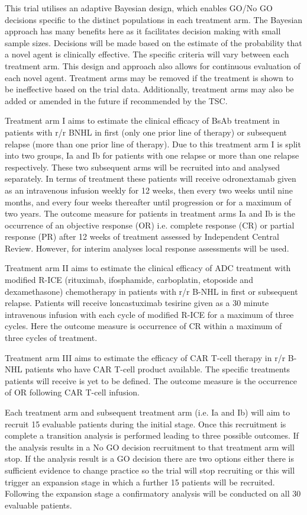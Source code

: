 This trial utilises an adaptive Bayesian design, which enables GO/No GO decisions specific to the distinct populations in each treatment arm. The Bayesian approach has many benefits here as it facilitates decision making with small sample sizes. Decisions will be made based on the estimate of the probability that a novel agent is clinically effective. The specific criteria will vary between each treatment arm. This design and approach also allows for continuous evaluation of each novel agent. Treatment arms may be removed if the treatment is shown to be ineffective based on the trial data. Additionally, treatment arms may also be added or amended in the future if recommended by the TSC. 

Treatment arm \RN{1} aims to estimate the clinical efficacy of BsAb treatment in patients with r/r BNHL in first (only one prior line of therapy) or subsequent relapse (more than one prior line of therapy). Due to this treatment arm \RN{1} is split into two groups, \RN{1}a and \RN{1}b for patients with one relapse or more than one relapse respectively. These two subsequent arms will be recruited into and analysed separately. In terms of treatment these patients will receive odronextamab given as an intravenous infusion weekly for 12 weeks, then every two weeks until nine months, and every four weeks thereafter until progression or for a maximum of two years. The outcome measure for patients in treatment arms \RN{1}a and \RN{1}b is the occurrence of an objective response (OR) i.e. complete response (CR) or partial response (PR) after 12 weeks of treatment assessed by Independent Central Review. However, for interim analyses local response assessments will be used. 

Treatment arm \RN{2} aims to estimate the clinical efficacy of ADC treatment with modified R-ICE (rituximab, ifosphamide, carboplatin, etoposide and dexamethasone) chemotherapy in patients with r/r B-NHL in first or subsequent relapse. Patients will receive loncastuximab tesirine given as a 30 minute intravenous infusion with each cycle of modified R-ICE for a maximum of three cycles. Here the outcome measure is occurrence of CR within a maximum of three cycles of treatment. 

Treatment arm \RN{3} aims to estimate the efficacy of CAR T-cell therapy in r/r B-NHL patients who have CAR T-cell product available. The specific treatments patients will receive is yet to be defined. The outcome measure is the occurrence of OR following CAR T-cell infusion. 

Each treatment arm and subsequent treatment arm (i.e. \RN{1}a and \RN{1}b) will aim to recruit 15 evaluable patients during the initial stage. Once this recruitment is complete a transition analysis is performed leading to three possible outcomes. If the analysis results in a No GO decision recruitment to that treatment arm will stop. If the analysis result is a GO decision there are two options either there is sufficient evidence to change practice so the trial will stop recruiting or this will trigger an expansion stage in which a further 15 patients will be recruited. Following the expansion stage a confirmatory analysis will be conducted on all 30 evaluable patients. 

